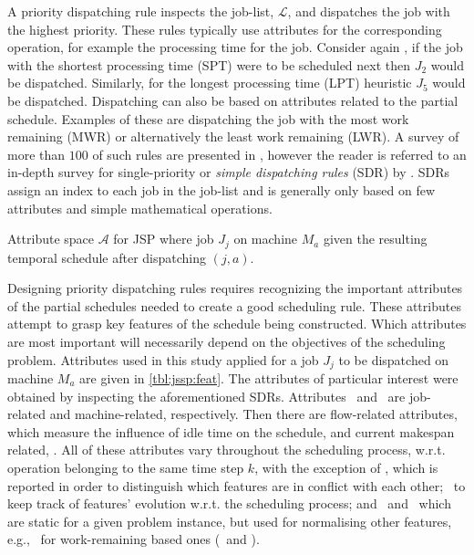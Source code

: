 \documentclass[smallextended]{svjour3}
\begin{document}
A priority dispatching rule inspects the job-list, $\mathcal{L}$, and 
dispatches the job with the highest priority. 
These rules typically use attributes for the corresponding operation, for 
example the processing time for the job. 
Consider again , if the job with the shortest processing 
time (SPT) were to be scheduled next then $J_2$ would be dispatched. Similarly, 
for the longest processing time (LPT) heuristic $J_5$ would be dispatched. 
Dispatching can also be based on attributes related to the partial schedule. 
Examples of these are dispatching the job with the most work remaining (MWR) or 
alternatively the least work remaining (LWR). A survey of more than $100$ of 
such rules are presented in \citet{Panwalkar77}, however the reader is referred 
to an in-depth survey for single-priority or \emph{simple dispatching rules} 
(SDR) by \citet{Haupt89}.  SDRs assign an index to each job in the job-list and 
is generally only based on few attributes and simple mathematical operations.

\begin{table}[t!] \centering
  \caption[Attribute space $\mathcal{A}$ for JPS]{Attribute space $\mathcal{A}$ 
  for JSP where job $J_j$ on machine $M_a$ given the resulting temporal 
  schedule after dispatching $(j,a)$.
  }
  \label{tbl:jssp:feat}
  
\end{table}

Designing priority dispatching rules requires recognizing the important 
attributes of the partial schedules needed to create a good scheduling rule. 
These attributes attempt to grasp key features of the schedule being 
constructed. Which attributes are most important will necessarily depend on the
objectives of the scheduling problem. Attributes used in this study applied for 
a job $J_j$ to be dispatched on machine $M_a$ are given in \cref{tbl:jssp:feat}.
The attributes of particular interest were obtained by inspecting the 
aforementioned SDRs. Attributes \phiJobRelated\ and \phiMacRelated\ are 
job-related and machine-related, respectively. 
Then there are flow-related attributes, \phiFlowRelated\, which measure the 
influence of idle time on the schedule, and current makespan related, 
\phiScheduleRelated.
All of these attributes vary throughout the scheduling process, w.r.t. 
operation belonging to the same time step $k$, with the exception of \phimac, 
which is reported in order to distinguish which features are in conflict with 
each other;
\phistep\ to keep track of features' evolution w.r.t. the scheduling process; 
and \phitotalProc\ and \phiwrmTotal\ which are static for a given problem 
instance, but used for normalising other features, e.g., \phiwrmTotal\ for 
work-remaining based ones (\phiwrmJob\ and \phiwrmMac).
\end{document}
